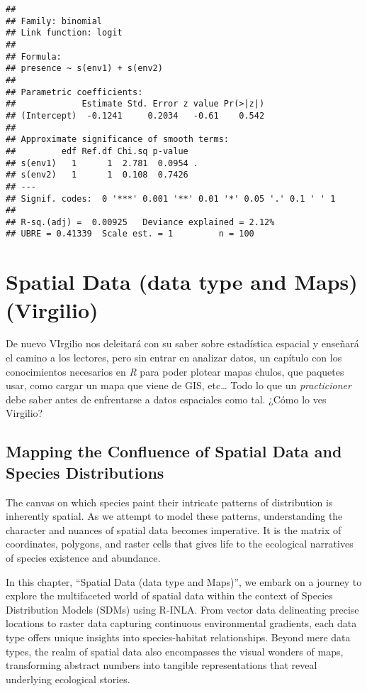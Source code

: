 \documentclass[
]{krantz}
\newcommand{\R}{\textsl{R }}
\begin{document}
\begin{verbatim}
## 
## Family: binomial 
## Link function: logit 
## 
## Formula:
## presence ~ s(env1) + s(env2)
## 
## Parametric coefficients:
##             Estimate Std. Error z value Pr(>|z|)
## (Intercept)  -0.1241     0.2034   -0.61    0.542
## 
## Approximate significance of smooth terms:
##         edf Ref.df Chi.sq p-value  
## s(env1)   1      1  2.781  0.0954 .
## s(env2)   1      1  0.108  0.7426  
## ---
## Signif. codes:  0 '***' 0.001 '**' 0.01 '*' 0.05 '.' 0.1 ' ' 1
## 
## R-sq.(adj) =  0.00925   Deviance explained = 2.12%
## UBRE = 0.41339  Scale est. = 1         n = 100
\end{verbatim}

\pagebreak 
\setcounter{chapter}{4}
\setcounter{section}{0}
\renewcommand{\thepage}{\arabic{page}}

\hypertarget{spatial-data-data-type-and-maps-virgilio}{%
\chapter{Spatial Data (data type and Maps) (Virgilio)}\label{spatial-data-data-type-and-maps-virgilio}}

De nuevo VIrgilio nos deleitará con su saber sobre estadística espacial y enseñará el camino a los lectores, pero sin entrar en analizar datos, un capítulo con los conocimientos necesarios en \R para poder plotear mapas chulos, que paquetes usar, como cargar un mapa que viene de GIS, etc\ldots{} Todo lo que un \emph{practicioner} debe saber antes de enfrentarse a datos espaciales como tal. ¿Cómo lo ves Virgilio?

\hypertarget{mapping-the-confluence-of-spatial-data-and-species-distributions}{%
\section{Mapping the Confluence of Spatial Data and Species Distributions}\label{mapping-the-confluence-of-spatial-data-and-species-distributions}}

The canvas on which species paint their intricate patterns of distribution is inherently spatial. As we attempt to model these patterns, understanding the character and nuances of spatial data becomes imperative. It is the matrix of coordinates, polygons, and raster cells that gives life to the ecological narratives of species existence and abundance.

In this chapter, ``Spatial Data (data type and Maps)'', we embark on a journey to explore the multifaceted world of spatial data within the context of Species Distribution Models (SDMs) using R-INLA. From vector data delineating precise locations to raster data capturing continuous environmental gradients, each data type offers unique insights into species-habitat relationships. Beyond mere data types, the realm of spatial data also encompasses the visual wonders of maps, transforming abstract numbers into tangible representations that reveal underlying ecological stories.
\end{document}

